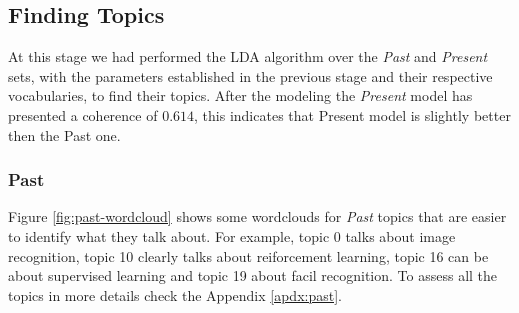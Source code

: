 \subsection{Finding Topics}

At this stage we had performed the LDA algorithm over the \textit{Past} and \textit{Present} sets, with the parameters established in the previous stage and their respective vocabularies, to find their topics. After the modeling the \textit{Present} model has presented a coherence of $0.614$, this indicates that Present model is slightly better then the Past one.

\subsubsection{Past}

Figure \ref{fig:past-wordcloud} shows some wordclouds for \textit{Past} topics that are easier to identify what they talk about. For example, topic 0 talks about image recognition, topic 10 clearly talks about reiforcement learning, topic 16 can be about supervised learning and topic 19 about facil recognition. To assess all the topics in more details check the Appendix \ref{apdx:past}.

